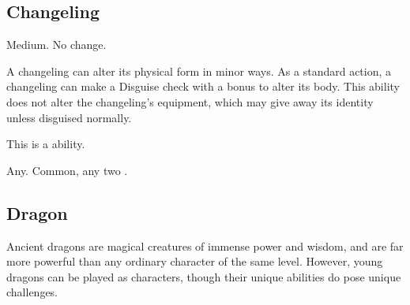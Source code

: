    \subsection{Changeling}

         Medium.
         No change.
        \begin{itemize}
             A changeling can alter its physical form in minor ways. As a standard action, a changeling can make a Disguise check with a  bonus to alter its body. This ability does not alter the changeling's equipment, which may give away its identity unless disguised normally.

            This is a \magical ability.
        \end{itemize}
         Any.
         Common, any two .

    \subsection{Dragon}
        Ancient dragons are magical creatures of immense power and wisdom, and are far more powerful than any ordinary character of the same level.
        However, young dragons can be played as characters, though their unique abilities do pose unique challenges.

